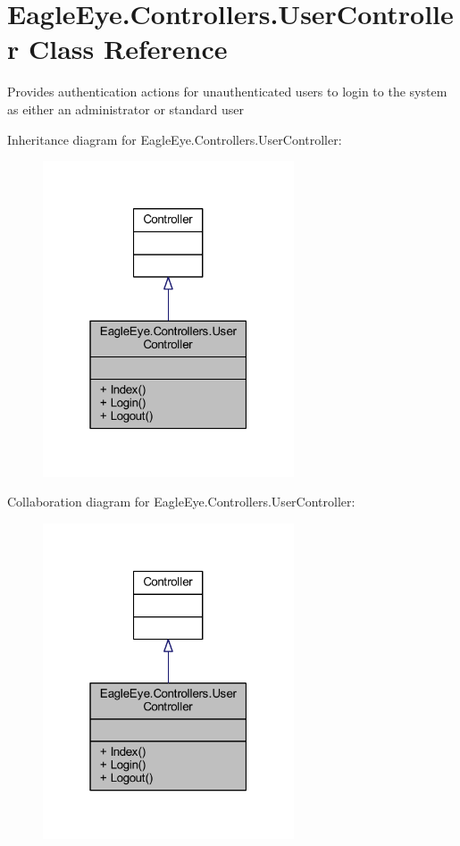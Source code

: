 \hypertarget{class_eagle_eye_1_1_controllers_1_1_user_controller}{}\section{Eagle\+Eye.\+Controllers.\+User\+Controller Class Reference}
\label{class_eagle_eye_1_1_controllers_1_1_user_controller}


Provides authentication actions for unauthenticated users to login to the system as either an administrator or standard user  




Inheritance diagram for Eagle\+Eye.\+Controllers.\+User\+Controller\+:\nopagebreak
\begin{figure}[H]
\begin{center}
\leavevmode
\includegraphics[width=211pt]{class_eagle_eye_1_1_controllers_1_1_user_controller__inherit__graph}
\end{center}
\end{figure}


Collaboration diagram for Eagle\+Eye.\+Controllers.\+User\+Controller\+:\nopagebreak
\begin{figure}[H]
\begin{center}
\leavevmode
\includegraphics[width=211pt]{class_eagle_eye_1_1_controllers_1_1_user_controller__coll__graph}
\end{center}
\end{figure}
